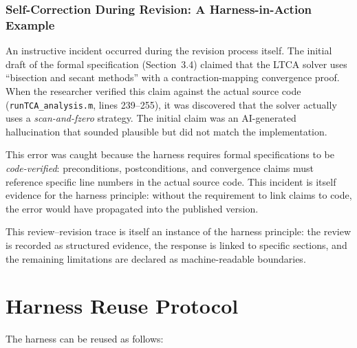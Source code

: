 \documentclass{article}
\newcommand{\revmark}{\marginpar{\footnotesize\textcolor{blue}{\textbf{Rev.\,2}}}}
\begin{document}
\subsubsection{Self-Correction During Revision: A Harness-in-Action Example}\revmark
An instructive incident occurred during the revision process itself. The initial draft of the formal specification (Section~3.4) claimed that the LTCA solver uses ``bisection and secant methods'' with a contraction-mapping convergence proof. When the researcher verified this claim against the actual source code (\texttt{runTCA\_analysis.m}, lines 239--255), it was discovered that the solver actually uses a \emph{scan-and-fzero} strategy. The initial claim was an AI-generated hallucination that sounded plausible but did not match the implementation.

This error was caught because the harness requires formal specifications to be \emph{code-verified}: preconditions, postconditions, and convergence claims must reference specific line numbers in the actual source code. This incident is itself evidence for the harness principle: without the requirement to link claims to code, the error would have propagated into the published version.

This review--revision trace is itself an instance of the harness principle: the review is recorded as structured evidence, the response is linked to specific sections, and the remaining limitations are declared as machine-readable boundaries.

\section{Harness Reuse Protocol}

The harness can be reused as follows:
\end{document}
